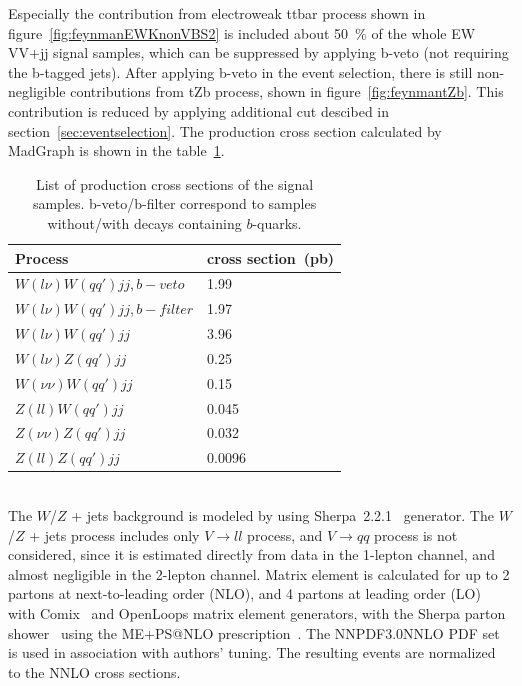 Especially the contribution from electroweak ttbar process shown in figure~\ref{fig:feynmanEWKnonVBS2} is included about 50~\% of the whole EW VV+jj signal samples, which can be suppressed by applying b-veto (not requiring the b-tagged jets). After applying b-veto in the event selection, there is still non-negligible contributions from tZb process, shown in figure~\ref{fig:feynmantZb}. This contribution is reduced by applying additional cut descibed in section~\ref{sec:eventselection}.
The production cross section calculated by MadGraph is shown in the table~\ref{tab:VBS_sig_samples}. \\ 
\begin{table}[!htbp]
\begin{center}
\small
\begin{tabular}{|l|l|}
\hline
Process & cross section~(pb) \\
\hline
$W(l\nu)W(qq\prime)jj,b-veto$    &  1.99    \\
$W(l\nu)W(qq\prime)jj,b-filter$  &  1.97   \\
$W(l\nu)W(qq\prime)jj$            &  3.96   \\
$W(l\nu)Z(qq\prime)jj$            &  0.25   \\
$W(\nu\nu)W(qq\prime)jj$          &  0.15   \\
$Z(ll)W(qq\prime)jj$              &  0.045  \\
$Z(\nu\nu)Z(qq\prime)jj$          &  0.032  \\
$Z(ll)Z(qq\prime)jj$              &  0.0096 \\
\hline
\end{tabular}
\caption{List of production cross sections of the signal samples. b-veto/b-filter correspond to samples without/with decays containing $b$-quarks.}
\label{tab:VBS_sig_samples}
\end{center}
\end{table}

\noindent\textbf{} \\ 
The $W$/$Z$ + jets background is modeled by using Sherpa~2.2.1~\cite{Gleisberg:2008ta} generator. 
The $W$/$Z$ + jets process includes only $V \rightarrow l l$ process, and $V \rightarrow q q$ process is not considered, since it is estimated directly from data in the 1-lepton channel, and almost negligible in the 2-lepton channel.
Matrix element is calculated for up to 2 partons at next-to-leading order (NLO), and 4 partons at leading order (LO) with Comix~\cite{Gleisberg:2008fv} and OpenLoops\cite{Cascioli:2011va} matrix element generators, with the Sherpa parton shower~\cite{Schumann:2007mg} using the ME+PS@NLO prescription~\cite{Hoeche:2012yf}.
The NNPDF3.0NNLO PDF set is used in association with authors' tuning. The resulting events are normalized to the NNLO cross sections.

